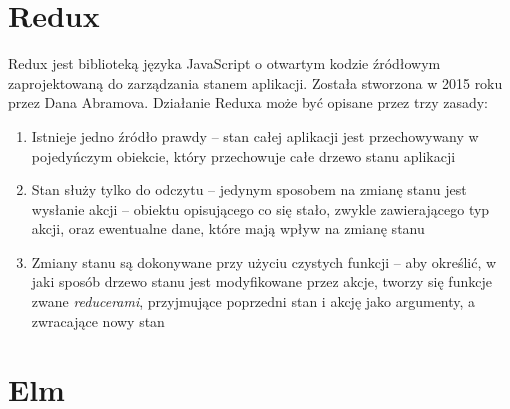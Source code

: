 \section{Redux}
Redux jest biblioteką języka JavaScript o otwartym kodzie źródłowym zaprojektowaną do zarządzania stanem aplikacji. Została stworzona w 2015 roku przez Dana Abramova. Działanie Reduxa może być opisane przez trzy zasady:
\begin{enumerate}
	\item Istnieje jedno źródło prawdy -- stan całej aplikacji jest przechowywany w pojedyńczym obiekcie, który przechowuje całe drzewo stanu aplikacji
	\item Stan służy tylko do odczytu -- jedynym sposobem na zmianę stanu jest wysłanie akcji -- obiektu opisującego co się stało, zwykle zawierającego typ akcji, oraz ewentualne dane, które mają wpływ na zmianę stanu
	\item Zmiany stanu są dokonywane przy użyciu czystych funkcji -- aby określić, w jaki sposób drzewo stanu jest modyfikowane przez akcje, tworzy się funkcje zwane \textit{reducerami}, przyjmujące poprzedni stan i akcję jako argumenty, a zwracające nowy stan
\end{enumerate}

\section{Elm}